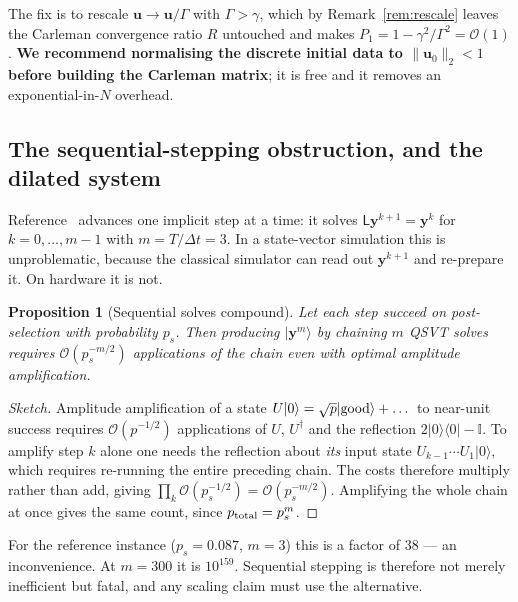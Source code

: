 \documentclass[11pt,a4paper]{article}
\theoremstyle{plain}
\newtheorem{proposition}{Proposition}[section]
\theoremstyle{definition}
\theoremstyle{remark}
\newcommand{\Oh}{\mathcal{O}}
\newcommand{\ket}[1]{\lvert #1 \rangle}
\newcommand{\bra}[1]{\langle #1 \rvert}
\newcommand{\norm}[1]{\lVert #1 \rVert}
\newcommand{\Id}{\mathbb{I}}
\newcommand{\uvec}{\bm{u}}
\newcommand{\yvec}{\bm{y}}
\newcommand{\Lmat}{\mathsf{L}}
\begin{document}
The fix is to rescale $\uvec\to\uvec/\Gamma$ with $\Gamma>\gamma$, which by
Remark~\ref{rem:rescale} leaves the Carleman convergence ratio $R$ untouched and
makes $P_1=1-\gamma^2/\Gamma^2=\Oh(1)$.  \textbf{We recommend normalising the
discrete initial data to $\norm{\uvec_0}_2<1$ before building the Carleman
matrix}; it is free and it removes an exponential-in-$N$ overhead.

\subsection{The sequential-stepping obstruction, and the dilated system}
\label{sec:sequential}

Reference~\cite{Setty2026} advances one implicit step at a time: it solves
$\Lmat\yvec^{k+1}=\yvec^{k}$ for $k=0,\dots,m-1$ with $m=T/\Delta t=3$.  In a
state-vector simulation this is unproblematic, because the classical simulator
can read out $\yvec^{k+1}$ and re-prepare it.  On hardware it is not.

\begin{proposition}[Sequential solves compound]
\label{prop:seq}
Let each step succeed on post-selection with probability $p_s$.  Then producing
$\ket{\yvec^{m}}$ by chaining $m$ QSVT solves requires
$\Oh(p_s^{-m/2})$ applications of the chain even with optimal amplitude
amplification.
\end{proposition}

\begin{proof}[Sketch]
Amplitude amplification of a state $U\ket{0}=\sqrt{p}\ket{\rm good}+\dots$ to
near-unit success requires $\Oh(p^{-1/2})$ applications of $U$, $U^\dagger$ and
the reflection $2\ket{0}\!\bra{0}-\Id$.  To amplify step $k$ alone one needs the
reflection about \emph{its} input state $U_{k-1}\cdots U_1\ket{0}$, which
requires re-running the entire preceding chain.  The costs therefore multiply
rather than add, giving $\prod_{k}\Oh(p_s^{-1/2})=\Oh(p_s^{-m/2})$.  Amplifying
the whole chain at once gives the same count, since
$p_{\rm total}=p_s^{m}$.
\end{proof}

For the reference instance ($p_s=0.087$, $m=3$) this is a factor of $38$ --- an
inconvenience.  At $m=300$ it is $10^{159}$.  Sequential stepping is therefore
not merely inefficient but fatal, and any scaling claim must use the alternative.
\end{document}
